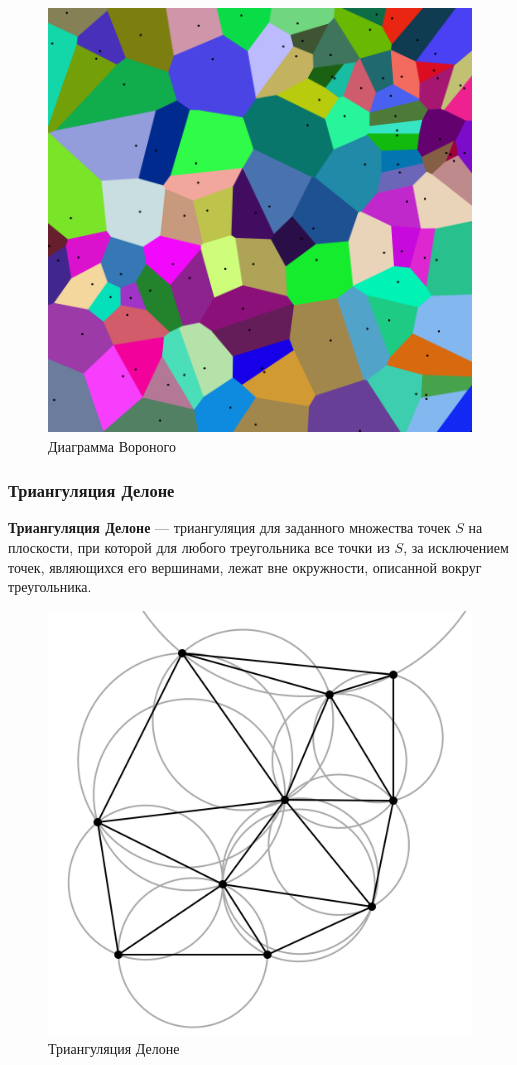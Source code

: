 \begin{figure}[H]
    \centering
    \includegraphics[width=1\linewidth]{voronoi-diagram.png}
    \caption{Диаграмма Вороного}
\end{figure}

\subsubsection*{Триангуляция Делоне}

\textbf{Триангуляция Делоне} — триангуляция для заданного множества точек $S$ на плоскости, при которой для любого треугольника все точки из $S$, за исключением точек, являющихся его вершинами, лежат вне окружности, описанной вокруг треугольника.

\begin{figure}[H]
    \centering
    \includegraphics[width=0.75\linewidth]{delaunay-circumcircles-vectorial.png}
    \caption{Триангуляция Делоне}
\end{figure}

